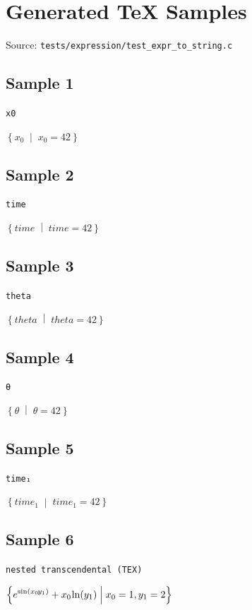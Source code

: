 \documentclass{article}
\begin{document}
\section*{Generated TeX Samples}
\noindent Source: \texttt{tests/expression/test\_expr\_to\_string.c}

\subsection*{Sample 1}
\noindent\texttt{x0}
\begin{flushleft}
$\displaystyle \left\{ x_{0} \;\middle|\; x_{0} = 42 \right\}$
\end{flushleft}

\subsection*{Sample 2}
\noindent\texttt{time}
\begin{flushleft}
$\displaystyle \left\{ \mathit{time} \;\middle|\; \mathit{time} = 42 \right\}$
\end{flushleft}

\subsection*{Sample 3}
\noindent\texttt{theta}
\begin{flushleft}
$\displaystyle \left\{ \mathit{theta} \;\middle|\; \mathit{theta} = 42 \right\}$
\end{flushleft}

\subsection*{Sample 4}
\noindent\texttt{θ}
\begin{flushleft}
$\displaystyle \left\{ \theta \;\middle|\; \theta = 42 \right\}$
\end{flushleft}

\subsection*{Sample 5}
\noindent\texttt{time₁}
\begin{flushleft}
$\displaystyle \left\{ \mathit{time_{1}} \;\middle|\; \mathit{time_{1}} = 42 \right\}$
\end{flushleft}

\subsection*{Sample 6}
\noindent\texttt{nested transcendental (TEX)}
\begin{flushleft}
$\displaystyle \left\{ e^{\sin(x_{0}\mkern-2mu y_{1})} + x_{0}\mkern-2mu \ln(y_{1}) \;\middle|\; x_{0} = 1, y_{1} = 2 \right\}$
\end{flushleft}
\end{document}
